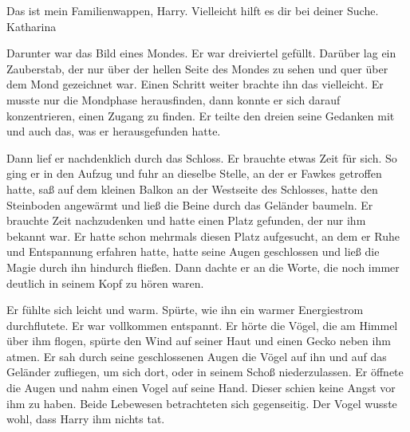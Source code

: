 \begin{brief}
Das ist mein Familienwappen, Harry. Vielleicht hilft es dir bei deiner Suche.
\signumspace
Katharina
\end{brief}

Darunter war das Bild eines Mondes. Er war dreiviertel gefüllt. Darüber lag ein Zauberstab, der nur über der hellen Seite des Mondes zu sehen und quer über dem Mond gezeichnet war. Einen Schritt weiter brachte ihn das vielleicht. Er musste nur die Mondphase herausfinden, dann konnte er sich darauf konzentrieren, einen Zugang zu finden. Er teilte den dreien seine Gedanken mit und auch das, was er herausgefunden hatte.

Dann lief er nachdenklich durch das Schloss.
Er brauchte etwas Zeit für sich. So ging er in den Aufzug und fuhr an dieselbe Stelle, an der er Fawkes getroffen hatte, saß auf dem kleinen Balkon an der Westseite des Schlosses, hatte den Steinboden angewärmt und ließ die Beine durch das Geländer baumeln. Er brauchte Zeit nachzudenken und hatte einen Platz gefunden, der nur ihm bekannt war. Er hatte schon mehrmals diesen Platz aufgesucht, an dem er Ruhe und Entspannung erfahren hatte, hatte seine Augen geschlossen und ließ die Magie durch ihn hindurch fließen. Dann dachte er an die Worte, die noch immer deutlich in seinem Kopf zu hören waren.


Er fühlte sich leicht und warm. Spürte, wie ihn ein warmer Energiestrom durchflutete. Er war vollkommen entspannt. Er hörte die Vögel, die am Himmel über ihm flogen, spürte den Wind auf seiner Haut und einen Gecko neben ihm atmen. Er sah durch seine geschlossenen Augen die Vögel auf ihn und auf das Geländer zufliegen, um sich dort, oder in seinem Schoß niederzulassen. Er öffnete die Augen und nahm einen Vogel auf seine Hand. Dieser schien keine Angst vor ihm zu haben. Beide Lebewesen betrachteten sich gegenseitig. Der Vogel wusste wohl, dass Harry ihm nichts tat.

